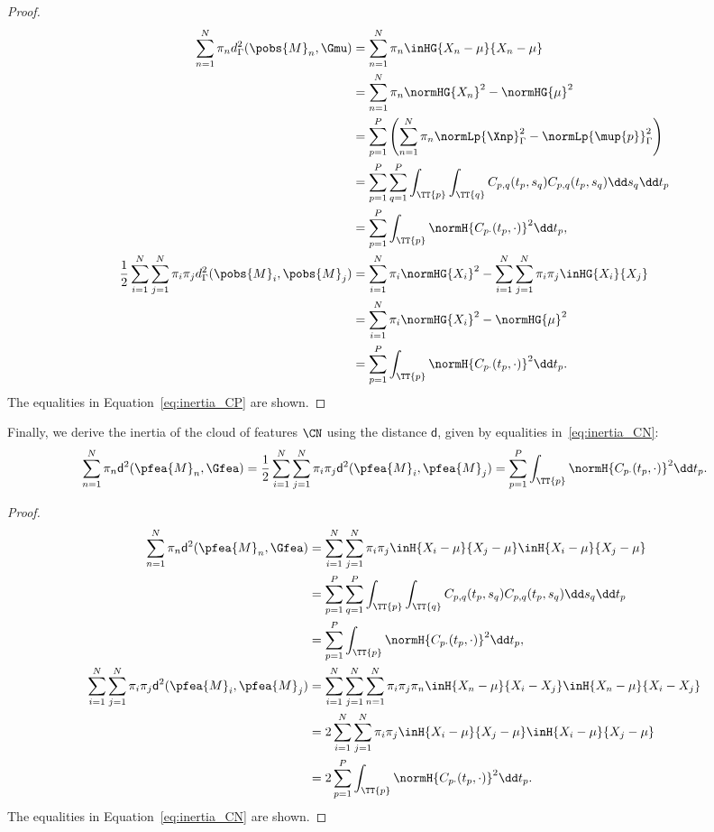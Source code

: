 \begin{proof}
\begin{align}
   \sum_{n = 1}^N \pi_n d_\Gamma^2(\pobs{M}_n, \Gmu) &= \sum_{n = 1}^N \pi_n \inHG{X_n - \mu}{X_n - \mu} \\
   &= \sum_{n = 1}^N \pi_n \normHG{X_n}^2 - \normHG{\mu}^2 \\
   &= \sum_{p = 1}^P \left(\sum_{n = 1}^N \pi_n \normLp{\Xnp}_{\Gamma}^2 - \normLp{\mup{p}}_{\Gamma}^2\right) \\
   &= \sum_{p = 1}^P \sum_{q = 1}^P \int_{\TT{p}} \int_{\TT{q}} C_{p,q}(t_p, s_q)C_{p,q}(t_p, s_q) \dd s_q \dd t_p \\
   &= \sum_{p = 1}^P \int_{\TT{p}} \normH{C_{p \cdot}(t_p, \cdot)}^2 \dd t_p, \\
   \frac{1}{2}\sum_{i = 1}^N \sum_{j = 1}^N \pi_i \pi_j d_\Gamma^2(\pobs{M}_i, \pobs{M}_j)&= \sum_{i = 1}^N \pi_i \normHG{X_i}^2 - \sum_{i = 1}^N \sum_{j = 1}^N \pi_i\pi_j \inHG{X_i}{X_j} \\
    &= \sum_{i = 1}^N \pi_i \normHG{X_i}^2 - \normHG{\mu}^2 \\
    &= \sum_{p = 1}^P \int_{\TT{p}} \normH{C_{p \cdot}(t_p, \cdot)}^2 \dd t_p. 
\end{align}
The equalities in Equation~\eqref{eq:inertia_CP} are shown.
\end{proof}
Finally, we derive the inertia of the cloud of features $\CN$ using the distance $\mathsf{d}$, given by equalities in~\eqref{eq:inertia_CN}:
$$\sum_{n = 1}^N \pi_n \mathsf{d}^2(\pfea{M}_n, \Gfea) = \frac{1}{2}\sum_{i = 1}^N \sum_{j = 1}^N \pi_i \pi_j \mathsf{d}^2(\pfea{M}_i, \pfea{M}_j) = \sum_{p = 1}^P \int_{\TT{p}} \normH{C_{p \cdot}(t_p, \cdot)}^2 \dd t_p.$$

\begin{proof}
\begin{align}
\sum_{n = 1}^N \pi_n \mathsf{d}^2(\pfea{M}_n, \Gfea) &= \sum_{i = 1}^N \sum_{j = 1}^N \pi_i \pi_j \inH{X_i - \mu}{X_j - \mu}\inH{X_i - \mu}{X_j - \mu} \\
&= \sum_{p = 1}^P \sum_{q = 1}^P \int_{\TT{p}} \int_{\TT{q}} C_{p,q}(t_p, s_q)C_{p,q}(t_p, s_q) \dd s_q \dd t_p \\
&= \sum_{p = 1}^P \int_{\TT{p}} \normH{C_{p \cdot}(t_p, \cdot)}^2 \dd t_p,\\
\sum_{i = 1}^N \sum_{j = 1}^N \pi_i \pi_j \mathsf{d}^2(\pfea{M}_i, \pfea{M}_j) &= \sum_{i = 1}^N \sum_{j = 1}^N \sum_{n = 1}^N \pi_i \pi_j \pi_n \inH{X_n - \mu}{X_i - X_j}\inH{X_n - \mu}{X_i - X_j} \\
&= 2\sum_{i = 1}^N \sum_{j = 1}^N \pi_i \pi_j \inH{X_i - \mu}{X_j - \mu}\inH{X_i - \mu}{X_j - \mu} \\
&= 2\sum_{p = 1}^P \int_{\TT{p}} \normH{C_{p \cdot}(t_p, \cdot)}^2 \dd t_p.
\end{align}
The equalities in Equation~\eqref{eq:inertia_CN} are shown.    
\end{proof}


